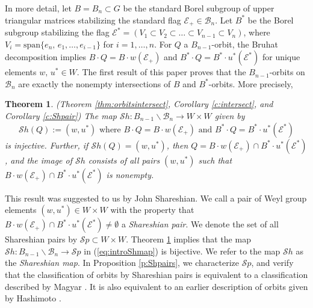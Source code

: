 \documentclass[12pt]{amsart}
\numberwithin{equation}{section}
\newtheorem{thm}{Theorem}[section]
\newcommand{\B}{\mathcal{B}}
\newcommand{\Borbitspace}{B_{n-1}\backslash\B_{n}}
\newcommand{\Sh}{\mathcal{S}h}
\newcommand{\Sp}{\mathcal{S}p}
\begin{document}
In more detail, let $B=B_{n}\subset G$ be the standard Borel subgroup of upper triangular matrices stabilizing 
the standard flag $\mathcal{E}_{+}\in\B_{n}$.  Let $B^{*}$ be the Borel subgroup stabilizing the flag $\mathcal{E}^{*}=(V_{1}\subset V_{2}\subset\dots\subset V_{n-1}\subset V_{n})$, where $V_{i}=\mbox{span}\{e_{n},\, e_{1},\dots, e_{i-1}\}$ for $i=1,\dots, n$.  For $Q$ a $B_{n-1}$-orbit, the Bruhat decomposition implies $B\cdot Q=B \cdot w(\mathcal{E}_{+})$ and $B^{*}\cdot Q=B^{*}\cdot u^{*}(\mathcal{E}^{*})$ for unique elements $w, \, u^{*}\in W$.  The first result of this paper proves that the $B_{n-1}$-orbits on $\B_{n}$ are exactly the nonempty intersections of $B$ and $B^{*}$-orbits.  
More precisely,
\begin{thm}\label{thm:introinter}(Theorem \ref{thm:orbitsintersect}, Corollary \ref{c:intersect}, and Corollary \ref{c:Shpair})
The map $\Sh:\Borbitspace \to W\times W$ given by 
\begin{equation}\label{eq:introShmap}
\Sh(Q):=(w,u^{*})\mbox{ where } B\cdot Q=B \cdot w(\mathcal{E}_{+})\mbox{ and } B^{*}\cdot Q =  B^{*}\cdot u^{*}(\mathcal{E}^{*})
\end{equation} 
is injective. Further, if $\Sh(Q)=(w,u^{*})$, then 
$Q=B\cdot w(\mathcal{E}_{+})\cap B^{*}\cdot u^{*}(\mathcal{E}^{*})$, and the image of $\Sh$ consists of all pairs $(w,u^{*})$ such that 
$B\cdot w(\mathcal{E}_{+})\cap B^{*}\cdot u^{*}(\mathcal{E}^{*})$ is nonempty.
\end{thm}

This result was suggested to us by John Shareshian.  We call a pair of Weyl group elements $(w,u^{*})\in W\times W$ with the property that $B\cdot w(\mathcal{E}_{+})\cap B^{*}\cdot u^{*}(\mathcal{E}^{*})\neq \emptyset$ a \emph{Shareshian pair}.  We denote the set of all Shareshian pairs by $\mathcal{S}p\subset W\times W$. Theorem \ref{thm:introinter} implies that the map $\Sh: \Borbitspace\rightarrow \Sp$ in (\ref{eq:introShmap}) is bijective.  We refer to the map $\Sh$ as the \emph{Shareshian map}.   In Proposition \ref{p:Shpairs}, we characterize $\Sp$, and verify that the classification of orbits by Shareshian pairs is equivalent to a classification described by Magyar \cite{Magyar}.  It is also equivalent to an earlier description of orbits given by Hashimoto \cite{Hashi}.

\end{document}
